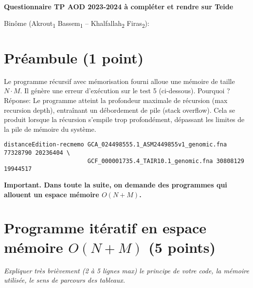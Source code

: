 \documentclass[10pt,a4paper]{article}
\begin{document}
\thispagestyle{empty}

\noindent\centerline{\bf\large Questionnaire TP AOD 2023-2024 à compléter et rendre sur Teide}
Binôme (Akrout\textsubscript{1} Bassem\textsubscript{1} -- Khalfallah\textsubscript{2} Firas\textsubscript{2}): \dotfill

\section{Préambule (1 point)}
Le programme récursif avec mémorisation fourni alloue une mémoire de taille $N \cdot M$. Il génère une erreur d'exécution sur le test 5 (ci-dessous). Pourquoi ?
Réponse: Le programme atteint la profondeur maximale de récursion (max recursion depth), entraînant un débordement de pile (stack overflow). Cela se produit lorsque la récursion s'empile trop profondément, dépassant les limites de la pile de mémoire du système.
\begin{verbatim}
distanceEdition-recmemo GCA_024498555.1_ASM2449855v1_genomic.fna 77328790 20236404 \
                        GCF_000001735.4_TAIR10.1_genomic.fna 30808129 19944517
\end{verbatim}

{\noindent\bf{Important.} Dans toute la suite, on demande des programmes qui allouent un espace mémoire $O(N+M)$.}

\section{Programme itératif en espace mémoire $O(N+M)$ (5 points)}
{\em Expliquer très brièvement (2 à 5 lignes max) le principe de votre code, la mémoire utilisée, le sens de parcours des tableaux.}
\end{document}
